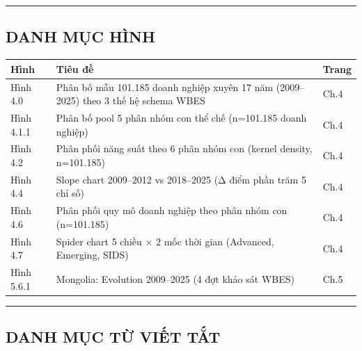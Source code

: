\documentclass[12pt,a4paper]{article}
\begin{document}
\begin{center}\rule{0.5\linewidth}{0.5pt}\end{center}

\hypertarget{danh-mux1ee5c-huxecnh}{%
\subsection{DANH MỤC HÌNH}\label{danh-mux1ee5c-huxecnh}}

\begin{longtable}[]{@{}lll@{}}
\toprule\noalign{}
Hình & Tiêu đề & Trang \\
\midrule\noalign{}
\endhead
\bottomrule\noalign{}
\endlastfoot
Hình 4.0 & Phân bố mẫu 101.185 doanh nghiệp xuyên 17 năm (2009--2025)
theo 3 thế hệ schema WBES & Ch.4 \\
Hình 4.1.1 & Phân bố pool 5 phân nhóm con thể chế (n=101.185 doanh
nghiệp) & Ch.4 \\
Hình 4.2 & Phân phối năng suất theo 6 phân nhóm con (kernel density,
n=101.185) & Ch.4 \\
Hình 4.4 & Slope chart 2009--2012 vs 2018--2025 (Δ điểm phần trăm 5 chỉ
số) & Ch.4 \\
Hình 4.6 & Phân phối quy mô doanh nghiệp theo phân nhóm con (n=101.185)
& Ch.4 \\
Hình 4.7 & Spider chart 5 chiều × 2 mốc thời gian (Advanced, Emerging,
SIDS) & Ch.4 \\
Hình 5.6.1 & Mongolia: Evolution 2009--2025 (4 đợt khảo sát WBES) &
Ch.5 \\
\end{longtable}

\begin{center}\rule{0.5\linewidth}{0.5pt}\end{center}

\hypertarget{danh-mux1ee5c-tux1eeb-viux1ebft-tux1eaft}{%
\subsection{DANH MỤC TỪ VIẾT
TẮT}\label{danh-mux1ee5c-tux1eeb-viux1ebft-tux1eaft}}
\end{document}
